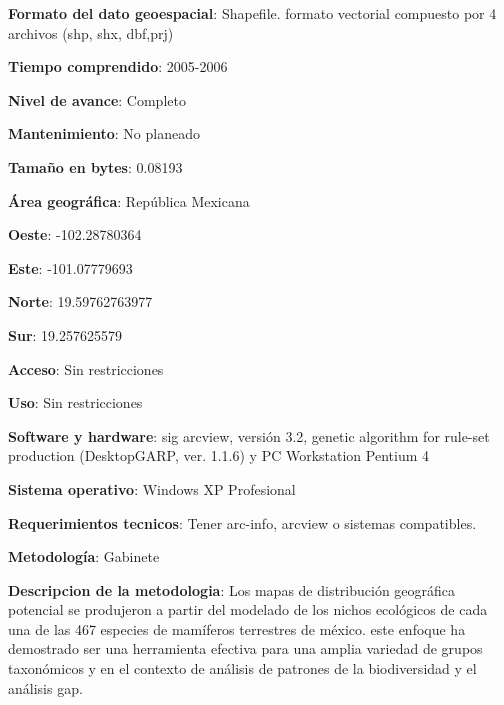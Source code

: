 \documentclass[twoside]{book}
\begin{document}
{\textbf{Formato del dato geoespacial}: Shapefile. formato vectorial compuesto por 4 archivos (shp, shx, dbf,prj)

\textbf{Tiempo comprendido}: 2005-2006

\textbf{Nivel de avance}: Completo

\textbf{Mantenimiento}: No planeado

\textbf{Tamaño en bytes}: 0.08193


\textbf{Área geográfica}: República Mexicana


\textbf{Oeste}: -102.28780364

\textbf{Este}: -101.07779693

\textbf{Norte}: 19.59762763977

\textbf{Sur}: 19.257625579


\textbf{Acceso}: Sin restricciones

\textbf{Uso}: Sin restricciones


\textbf{Software y hardware}: sig arcview, versión 3.2, genetic algorithm for rule-set production (DesktopGARP, ver. 1.1.6) y PC Workstation Pentium 4

\textbf{Sistema operativo}: Windows XP Profesional

\textbf{Requerimientos tecnicos}: Tener arc-info, arcview o sistemas compatibles.


\textbf{Metodología}: Gabinete

\textbf{Descripcion de la metodologia}: Los mapas de distribución geográfica potencial se produjeron a partir del modelado de los nichos ecológicos de cada una de las 467 especies de mamíferos terrestres de méxico. este enfoque ha demostrado ser una herramienta efectiva para una amplia variedad de grupos taxonómicos y en el contexto de análisis de patrones de la biodiversidad y el análisis gap.

}
\end{document}
